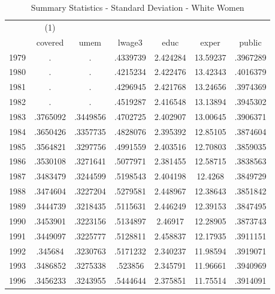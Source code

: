{
\def\sym#1{\ifmmode^{#1}\else\(^{#1}\)\fi}
\begin{longtable}{l*{1}{cccccc}}
\caption{Summary Statistics - Standard Deviation - White Women}\\
\hline\hline\endfirsthead\hline\endhead\hline\endfoot\endlastfoot
            &\multicolumn{1}{c}{(1)}&            &            &            &            &            \\
            &     covered&        umem&      lwage3&        educ&       exper&      public\\
\hline
1979        &           .&           .&    .4339739&    2.424284&    13.59237&    .3967289\\
1980        &           .&           .&    .4215234&    2.422476&    13.42343&    .4016379\\
1981        &           .&           .&    .4296945&    2.421768&    13.24656&    .3974369\\
1982        &           .&           .&    .4519287&    2.416548&    13.13894&    .3945302\\
1983        &    .3765092&    .3449856&    .4702725&    2.402907&    13.00645&    .3906371\\
1984        &    .3650426&    .3357735&    .4828076&    2.395392&    12.85105&    .3874604\\
1985        &    .3564821&    .3297756&    .4991559&    2.403516&    12.70803&    .3859035\\
1986        &    .3530108&    .3271641&    .5077971&    2.381455&    12.58715&    .3838563\\
1987        &    .3483479&    .3244599&    .5198543&    2.404198&     12.4268&    .3849729\\
1988        &    .3474604&    .3227204&    .5279581&    2.448967&    12.38643&    .3851842\\
1989        &    .3444739&    .3218435&    .5115631&    2.446249&    12.39153&    .3847495\\
1990        &    .3453901&    .3223156&    .5134897&     2.46917&    12.28905&    .3873743\\
1991        &    .3449097&    .3225777&    .5128811&    2.458837&    12.17935&    .3911151\\
1992        &     .345684&    .3230763&    .5171232&    2.340237&    11.98594&    .3919071\\
1993        &    .3486852&    .3275338&     .523856&    2.345791&    11.96661&    .3940969\\
1996        &    .3456233&    .3243955&    .5444644&    2.375851&    11.75514&    .3914091\\

\end{longtable}}
